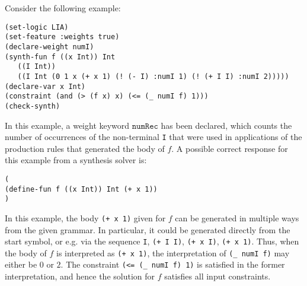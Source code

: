 \documentclass[english,a4paper,10pt]{article}
\begin{document}
\begin{example}
Consider the following example:
\begin{lstlisting}[language=SyGuS]
(set-logic LIA)
(set-feature :weights true)
(declare-weight numI)
(synth-fun f ((x Int)) Int
   ((I Int))
   ((I Int (0 1 x (+ x 1) (! (- I) :numI 1) (! (+ I I) :numI 2)))))
(declare-var x Int)
(constraint (and (> (f x) x) (<= (_ numI f) 1)))
(check-synth)
\end{lstlisting}
In this example, a weight keyword $\texttt{numRec}$ has been declared,
which counts the number of occurrences of the non-terminal \texttt{I} that
were used in applications of the production rules that generated the body of $f$.
A possible correct response for this example from a synthesis solver is:
\begin{lstlisting}[language=SyGuS]
(
(define-fun f ((x Int)) Int (+ x 1))
)
\end{lstlisting}
In this example,
the body \texttt{(+ x 1)} given for $f$ can be generated in multiple ways from the given grammar.
In particular, it could be generated directly from the start symbol,
or e.g. via the sequence \texttt{I}, \texttt{(+ I I)}, \texttt{(+ x I)}, \texttt{(+ x 1)}.
Thus, when the body of $f$ is interpreted as \texttt{(+ x 1)},
the interpretation of \texttt{(\_ numI f)} may either be $0$ or $2$.
The constraint \texttt{(<= (\_ numI f) 1)} is satisfied in the former interpretation,
and hence the solution for $f$ satisfies all input constraints.
\end{example}
\end{document}
